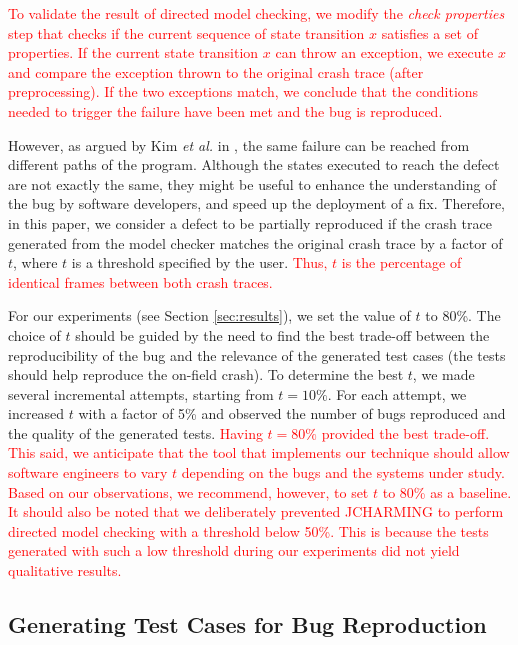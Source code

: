 \documentclass[times, doublespace]{smrauth}
\newcommand{\red}[1]{\textcolor{red}{#1}}
\begin{document}
{\red{To validate the result of directed model checking, we modify
the {\it check properties} step that checks if the current sequence
of state transition $x$ satisfies a set of properties. If the current
state transition $x$ can throw an exception, we execute $x$ and
compare the exception thrown to the original crash trace (after
preprocessing). If the two exceptions match, we conclude that
the conditions needed to trigger the failure have been met and
the bug is reproduced.}

However, as argued by Kim {\it et al.} in \cite{Kim2013b}, the same failure can
be reached from different paths of the program. Although the
states executed to reach the defect are not exactly the same,
they might be useful to enhance the understanding of the bug
by software developers, and speed up the deployment of a fix.
Therefore, in this paper, we consider a defect to be partially
reproduced if the crash trace generated from the model
checker matches the original crash trace by a factor of $t$, where
$t$ is a threshold specified by the user. \red{Thus, $t$ is the percentage of
identical frames between both crash traces.}

For our experiments (see Section \ref{sec:results}), we set the value of $t$ to 80\%.
The choice of $t$ should be guided by the need to find the best trade-off
between the reproducibility of the bug and
the relevance  of the generated test cases (the tests should help
 reproduce the on-field crash). To determine the best $t$, we made several incremental attempts, starting  from $t = 10\%$.  For each attempt, we increased $t$ with a factor of 5\% and
observed the number of bugs reproduced and the quality of the generated tests.
\red{Having $t = 80\%$ provided the best trade-off. This said, we anticipate that the tool that implements
our technique should allow software engineers to vary $t$ depending on the bugs and the systems under study. Based on our observations, we recommend, however,
to set $t$ to 80\% as a baseline. It should also be noted that we deliberately prevented JCHARMING to perform directed model checking with a threshold below 50\%. This is because the tests generated with such a low threshold during our experiments did not yield qualitative results.}


\subsection{Generating Test Cases for Bug Reproduction\label{sec:unit-tests}}

}
\end{document}
